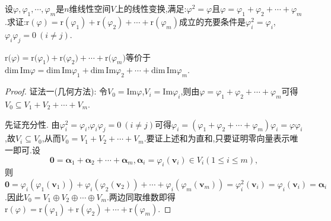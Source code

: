 \documentclass[../../main.tex]{subfiles}%
\begin{document}
\begin{proposition}\label{proposition:投影变换的性质x}
设\(\varphi,\varphi_1,\cdots,\varphi_m\)是\(n\)维线性空间\(V\)上的线性变换,满足:\(\varphi^2 = \varphi\)且\(\varphi=\varphi_1+\varphi_2+\cdots+\varphi_m\).求证:\(\text{r}(\varphi)=\text{r}(\varphi_1)+\text{r}(\varphi_2)+\cdots+\text{r}(\varphi_m)\)成立的充要条件是\(\varphi_i^2 = \varphi_i\),\(\varphi_i\varphi_j = 0\ (i\neq j)\).
\end{proposition}
\begin{note}
$\mathrm{r(}\varphi )=\mathrm{r(}\varphi _1)+\mathrm{r(}\varphi _2)+\cdots +\mathrm{r(}\varphi _m)$等价于$\mathrm{dim}\,\mathrm{Im}\varphi =\mathrm{dim}\,\mathrm{Im}\varphi _1+\mathrm{dim}\,\mathrm{Im}\varphi _2+\cdots +\mathrm{dim}\,\mathrm{Im}\varphi _m$.
\end{note}
\begin{proof}

{\color{blue}证法一(几何方法):} 令\(V_0 = \text{Im}\varphi\),\(V_i = \text{Im}\varphi_i\),则由\(\varphi=\varphi_1+\varphi_2+\cdots+\varphi_m\)可得\(V_0\subseteq V_1 + V_2+\cdots+V_m\).

先证充分性. 由\(\varphi_i^2 = \varphi_i\),\(\varphi_i\varphi_j = 0\ (i\neq j)\)可得\(\varphi_i=(\varphi_1+\varphi_2+\cdots+\varphi_m)\varphi_i=\varphi\varphi_i\),故\(V_i\subseteq V_0\),从而\(V_0 = V_1 + V_2+\cdots+V_m\).要证上述和为直和,只要证明零向量表示唯一即可.设
\[
\boldsymbol{0}=\boldsymbol{\alpha}_1+\boldsymbol{\alpha}_2+\cdots+\boldsymbol{\alpha}_m,\boldsymbol{\alpha}_i=\varphi_i(\boldsymbol{v}_i)\in V_i(1\leqslant  i\leqslant  m),
\]
则\(\boldsymbol{0}=\varphi_i(\varphi_1(\boldsymbol{v}_1))+\varphi_i(\varphi_2(\boldsymbol{v}_2))+\cdots+\varphi_i(\varphi_m(\boldsymbol{v}_m))=\varphi_i^2(\boldsymbol{v}_i)=\varphi_i(\boldsymbol{v}_i)=\boldsymbol{\alpha}_i\).因此\(V_0 = V_1\oplus V_2\oplus\cdots\oplus V_m\).两边同取维数即得\(\text{r}(\varphi)=\text{r}(\varphi_1)+\text{r}(\varphi_2)+\cdots+\text{r}(\varphi_m)\).


\end{proof}
\end{document}
